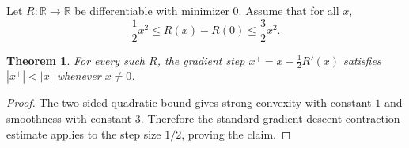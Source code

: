 \documentclass{article}
\newtheorem{theorem}{Theorem}
\begin{document}
Let $R:\mathbb{R}\to\mathbb{R}$ be differentiable with minimizer $0$. Assume that
for all $x$,
\[
\frac12 x^2 \le R(x)-R(0) \le \frac32 x^2.
\]

\begin{theorem}\label{thm:contraction}
For every such $R$, the gradient step $x^+=x-\frac12 R'(x)$ satisfies
$|x^+|<|x|$ whenever $x\ne0$.
\end{theorem}
\begin{proof}
The two-sided quadratic bound gives strong convexity with constant $1$ and
smoothness with constant $3$. Therefore the standard gradient-descent
contraction estimate applies to the step size $1/2$, proving the claim.
\end{proof}
\end{document}
